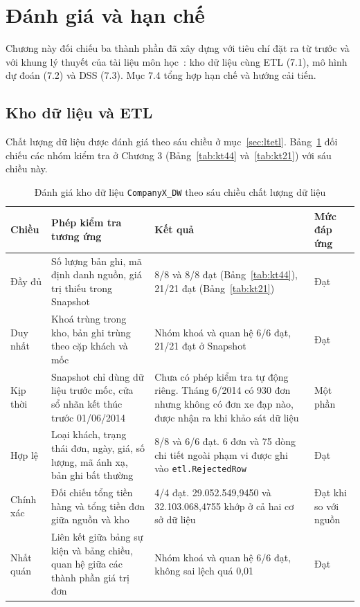 \section{Đánh giá và hạn chế}

Chương này đối chiếu ba thành phần đã xây dựng với tiêu chí đặt ra từ trước và với khung lý thuyết của tài liệu môn học~\cite{tlmh}: kho dữ liệu cùng ETL (7.1), mô hình dự đoán (7.2) và DSS (7.3). Mục 7.4 tổng hợp hạn chế và hướng cải tiến.

\subsection{Kho dữ liệu và ETL}
Chất lượng dữ liệu được đánh giá theo sáu chiều ở mục~\ref{sec:ltetl}. Bảng~\ref{tab:sauchieu} đối chiếu các nhóm kiểm tra ở Chương 3 (Bảng~\ref{tab:kt44} và~\ref{tab:kt21}) với sáu chiều này.

\begin{table}[!htbp]
\centering
\caption{Đánh giá kho dữ liệu \texttt{CompanyX\_DW} theo sáu chiều chất lượng dữ liệu}
\label{tab:sauchieu}
\footnotesize
\begin{tabular}{p{1.9cm}p{4.2cm}p{6.0cm}p{2.1cm}}
\toprule
Chiều & Phép kiểm tra tương ứng & Kết quả & Mức đáp ứng \\
\midrule
Đầy đủ & Số lượng bản ghi, mã định danh nguồn, giá trị thiếu trong Snapshot & 8/8 và 8/8 đạt (Bảng~\ref{tab:kt44}), 21/21 đạt (Bảng~\ref{tab:kt21}) & Đạt \\
Duy nhất & Khoá trùng trong kho, bản ghi trùng theo cặp khách và mốc & Nhóm khoá và quan hệ 6/6 đạt, 21/21 đạt ở Snapshot & Đạt \\
Kịp thời & Snapshot chỉ dùng dữ liệu trước mốc, cửa sổ nhãn kết thúc trước 01/06/2014 & Chưa có phép kiểm tra tự động riêng. Tháng 6/2014 có 930 đơn nhưng không có đơn xe đạp nào, được nhận ra khi khảo sát dữ liệu & Một phần \\
Hợp lệ & Loại khách, trạng thái đơn, ngày, giá, số lượng, mã ánh xạ, bản ghi bất thường & 8/8 và 6/6 đạt. 6 đơn và 75 dòng chi tiết ngoài phạm vi được ghi vào \texttt{etl.\allowbreak RejectedRow} & Đạt \\
Chính xác & Đối chiếu tổng tiền hàng và tổng tiền đơn giữa nguồn và kho & 4/4 đạt. 29.052.549,9450 và 32.103.068,4755 khớp ở cả hai cơ sở dữ liệu & Đạt khi so với nguồn \\
Nhất quán & Liên kết giữa bảng sự kiện và bảng chiều, quan hệ giữa các thành phần giá trị đơn & Nhóm khoá và quan hệ 6/6 đạt, không sai lệch quá 0,01 & Đạt \\
\bottomrule
\end{tabular}
\end{table}

